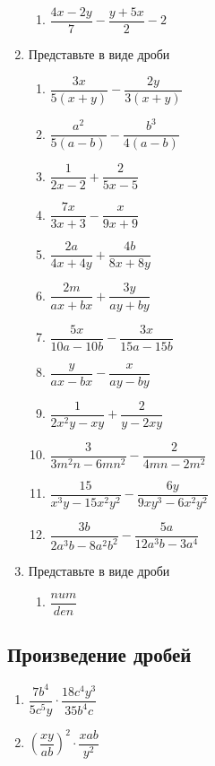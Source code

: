 \documentclass[10pt, a4paper]{article}
\begin{document}
\begin{enumerate}
\begin{multicols}{2}
\begin{enumerate}
			\item $\dfrac{4x-2y}{7}-\dfrac{y+5x}{2}-2$ 
		\end{enumerate}
	\end{multicols}
	\item Представьте в виде дроби
	\begin{multicols}{2}
		\begin{enumerate}
			\item $\dfrac{3x}{5(x+y)}-\dfrac{2y}{3(x+y)}$ 
			\item $\dfrac{a^2}{5(a-b)}-\dfrac{b^3}{4(a-b)}$ 
			\item $\dfrac{1}{2x-2}+\dfrac{2}{5x-5}$ 
			\item $\dfrac{7x}{3x+3}-\dfrac{x}{9x+9}$ 
			\item $\dfrac{2a}{4x+4y}+\dfrac{4b}{8x+8y}$ 
			\item $\dfrac{2m}{ax+bx}+\dfrac{3y}{ay+by}$ 
			\item $\dfrac{5x}{10a-10b}-\dfrac{3x}{15a-15b}$ 
			\item $\dfrac{y}{ax-bx}-\dfrac{x}{ay-by}$ 
			\item $\dfrac{1}{2x^2y-xy}+\dfrac{2}{y-2xy}$ 
			\item $\dfrac{3}{3m^2n-6mn^2}-\dfrac{2}{4mn-2m^2}$ 
			\item $\dfrac{15}{x^3y-15x^2y^2}-\dfrac{6y}{9xy^3-6x^2y^2}$ 
			\item $\dfrac{3b}{2a^3b-8a^2b^2}-\dfrac{5a}{12a^3b-3a^4}$ 
		\end{enumerate}
	\end{multicols}
	\item Представьте в виде дроби
	\begin{multicols}{2}
		\begin{enumerate}
			\item $\dfrac{num}{den}$ 
		\end{enumerate}
	\end{multicols}
\end{enumerate}
\subsection{Произведение дробей}
\begin{multicols}{3}
	\begin{enumerate}
		\item $\dfrac{7b^4}{5c^5y}\cdot\dfrac{18c^4y^3}{35b^4c}$ 
		\item $\left(\dfrac{xy}{ab}\right)^2\cdot\dfrac{xab}{y^2}$ 
	\end{enumerate}
\end{multicols}
\end{document}

